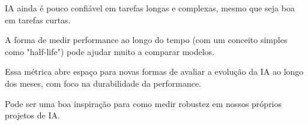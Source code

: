 {\subtitle{O que é possível aprender?}

\begin{hypeitemize}
\item IA ainda é pouco confiável em tarefas longas e complexas, mesmo que seja boa em tarefas curtas.
\item A forma de medir performance ao longo do tempo (com um conceito simples como "half-life") pode ajudar muito a comparar modelos.
\item Essa métrica abre espaço para novas formas de avaliar a evolução da IA ao longo dos meses, com foco na durabilidade da performance.
\item Pode ser uma boa inspiração para como medir robustez em nossos próprios projetos de IA.
\end{hypeitemize}


}